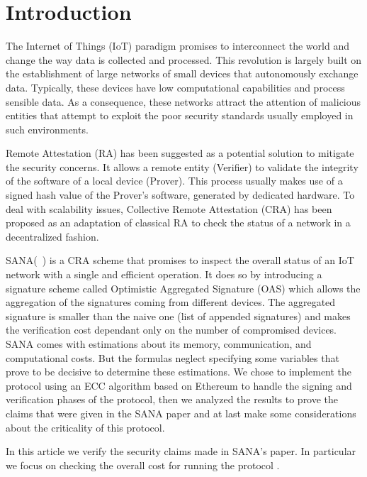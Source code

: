 \section{Introduction}

The Internet of Things (IoT) paradigm promises to interconnect the world and
change the way data is collected and processed.
This revolution is largely built on the establishment of large networks of small 
devices that autonomously exchange data.
Typically, these devices have low computational capabilities and process
sensible data.
As a consequence, these networks attract the attention of malicious entities
that attempt to exploit the poor security standards usually employed in such
environments.

Remote Attestation (RA) has been suggested as a potential solution to mitigate the
security concerns.
It allows a remote entity (\ie Verifier) to validate the integrity of
the software of a local device (\ie Prover).
This process usually makes use of a signed hash value of the Prover’s software, 
generated by dedicated hardware.
To deal with scalability issues, Collective Remote Attestation (CRA) has 
been proposed as an adaptation of classical RA to check the status of a network 
in a decentralized fashion.

SANA(~\cite{sana}) is a CRA scheme that promises to inspect the overall
status of an IoT network with a single and efficient operation.
It does so by introducing a signature scheme called Optimistic Aggregated
Signature (OAS) which allows the aggregation of the signatures coming from
different devices.
The aggregated signature is smaller than the naive one (\ie list of appended
signatures) and makes the verification cost dependant only on the number of
compromised devices.
SANA comes with estimations about its memory, communication, and computational costs. But the formulas neglect specifying some variables that prove to be decisive to determine these estimations.
We chose to implement the protocol using an ECC algorithm based on Ethereum to handle the signing and verification phases of the protocol, then we analyzed the results to prove the claims that were given in the SANA paper and at last make some considerations about the criticality of this protocol.

In this article we verify the security claims made in SANA's paper.
In particular we focus on checking the overall cost for running the protocol
.
